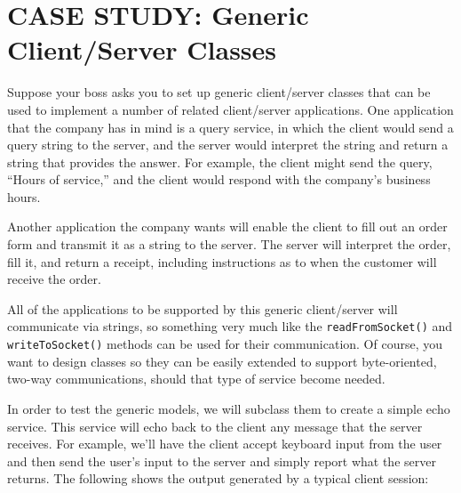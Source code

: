 
\section{CASE STUDY: Generic Client/Server Classes}
\label{sec-clientserver}\label{pg-sec-clientserver}
\noindent Suppose your boss asks you to set up generic client/server classes
that can be used to implement a number of related client/server
applications.  One application that the company has in mind is a query
service, in which the client would send a query string to the server,
and the server would interpret the string and return a string that
provides the answer.  For example, the client might send the query,
``Hours of service,'' and the client would respond with the company's
business hours.

Another application the company wants will enable the client to fill out an
order form and transmit it as a string to the server.  The server will
interpret the order, fill it, and return a receipt, including
instructions as to when the customer will receive the order.

All of the applications to be supported by this generic client/server
will communicate via strings, so something very much like the
{\tt readFromSocket()} and {\tt writeToSocket()} methods can be used for
their communication.  Of course, you want to design classes so they
can be easily extended to support byte-oriented, two-way
communications, should that type of service become needed.

In order to test the generic models, we will subclass them to create a
simple echo service.  This service will echo back to the client any
message that the server receives.  For example, we'll have the client
accept keyboard input from the user and then send the user's input to
the server and simply report what the server returns.   The following
shows the output generated by a typical client session:

